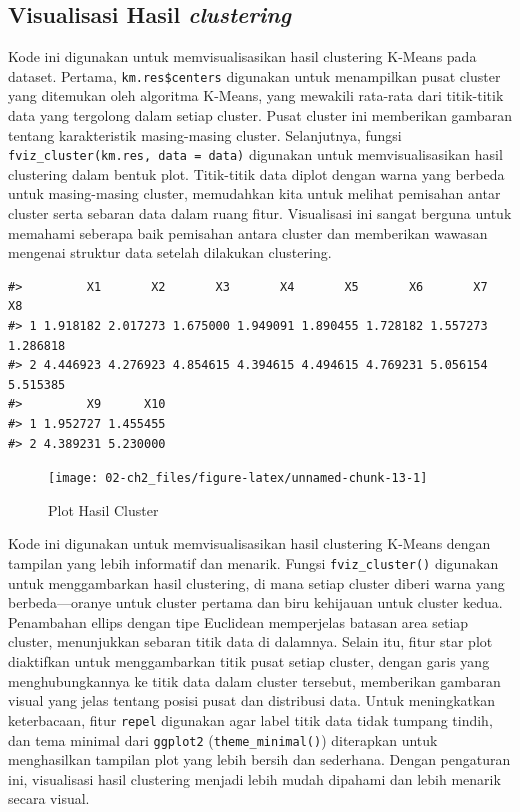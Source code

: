 \documentclass[
  oneside]{book}
\begin{document}
\subsection*{\texorpdfstring{Visualisasi Hasil \emph{clustering}}{Visualisasi Hasil clustering}}\label{visualisasi-hasil-clustering}

Kode ini digunakan untuk memvisualisasikan hasil clustering K-Means pada dataset. Pertama, \texttt{km.res\$centers} digunakan untuk menampilkan pusat cluster yang ditemukan oleh algoritma K-Means, yang mewakili rata-rata dari titik-titik data yang tergolong dalam setiap cluster. Pusat cluster ini memberikan gambaran tentang karakteristik masing-masing cluster. Selanjutnya, fungsi \texttt{fviz\_cluster(km.res,\ data\ =\ data)} digunakan untuk memvisualisasikan hasil clustering dalam bentuk plot. Titik-titik data diplot dengan warna yang berbeda untuk masing-masing cluster, memudahkan kita untuk melihat pemisahan antar cluster serta sebaran data dalam ruang fitur. Visualisasi ini sangat berguna untuk memahami seberapa baik pemisahan antara cluster dan memberikan wawasan mengenai struktur data setelah dilakukan clustering.

\begin{verbatim}
#>         X1       X2       X3       X4       X5       X6       X7       X8
#> 1 1.918182 2.017273 1.675000 1.949091 1.890455 1.728182 1.557273 1.286818
#> 2 4.446923 4.276923 4.854615 4.394615 4.494615 4.769231 5.056154 5.515385
#>         X9      X10
#> 1 1.952727 1.455455
#> 2 4.389231 5.230000
\end{verbatim}

\begin{figure}[h]

{\centering \texttt{[image: 02-ch2\_files/figure-latex/unnamed-chunk-13-1]} 

}

\caption{Plot Hasil Cluster}\label{fig:unnamed-chunk-13}
\end{figure}

Kode ini digunakan untuk memvisualisasikan hasil clustering K-Means dengan tampilan yang lebih informatif dan menarik. Fungsi \texttt{fviz\_cluster()} digunakan untuk menggambarkan hasil clustering, di mana setiap cluster diberi warna yang berbeda---oranye untuk cluster pertama dan biru kehijauan untuk cluster kedua. Penambahan ellips dengan tipe Euclidean memperjelas batasan area setiap cluster, menunjukkan sebaran titik data di dalamnya. Selain itu, fitur star plot diaktifkan untuk menggambarkan titik pusat setiap cluster, dengan garis yang menghubungkannya ke titik data dalam cluster tersebut, memberikan gambaran visual yang jelas tentang posisi pusat dan distribusi data. Untuk meningkatkan keterbacaan, fitur \texttt{repel} digunakan agar label titik data tidak tumpang tindih, dan tema minimal dari \texttt{ggplot2} (\texttt{theme\_minimal()}) diterapkan untuk menghasilkan tampilan plot yang lebih bersih dan sederhana. Dengan pengaturan ini, visualisasi hasil clustering menjadi lebih mudah dipahami dan lebih menarik secara visual.
\end{document}
